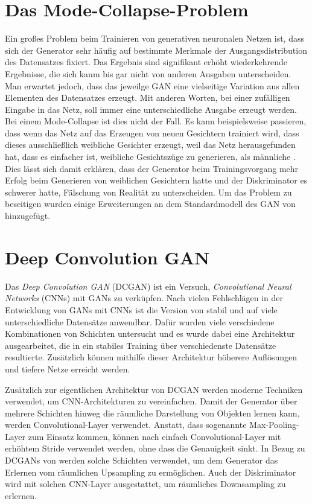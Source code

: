 \documentclass{hsflensburg}
\begin{document}
  \section{Das Mode-Collapse-Problem}
  Ein großes Problem beim Trainieren von generativen neuronalen Netzen ist, dass
  sich der Generator sehr häufig auf bestimmte Merkmale der Ausgangsdistribution
  des Datensatzes fixiert. Das Ergebnis sind signifikant erhöht wiederkehrende
  Ergebnisse, die sich kaum bis gar nicht von anderen Ausgaben unterscheiden.
  Man erwartet jedoch, dass das jeweilge GAN eine vielseitige Variation aus
  allen Elementen des Datensatzes erzeugt. Mit anderen Worten, bei einer
  zufälligen Eingabe in das Netz, soll immer eine unterschiedliche Ausgabe
  erzeugt werden. Bei einem Mode-Collapse ist dies nicht der Fall. Es kann
  beispielsweise passieren, dass wenn das Netz auf das Erzeugen von neuen
  Gesichtern trainiert wird, dass dieses ausschließlich weibliche Gesichter
  erzeugt, weil das Netz herausgefunden hat, dass es einfacher ist, weibliche
  Gesichtszüge zu generieren, als männliche \cite{richardson2018gans}. Dies
  lässt sich damit erklären, dass der Generator beim Trainingsvorgang mehr
  Erfolg beim Generieren von weiblichen Gesichtern hatte und der Diskriminator
  es schwerer hatte, Fälschung von Realität zu unterscheiden. Um das Problem zu
  beseitigen wurden einige Erweiterungen an dem Standardmodell des GAN von
  \cite{goodfellow2014generative} hinzugefügt.

  \section{Deep Convolution GAN}
  Das \textit{Deep Convolution GAN} (DCGAN) ist ein Versuch,
  \textit{Convolutional Neural Networks} (CNNs) mit GANs zu verküpfen. Nach
  vielen Fehlschlägen in der Entwicklung von GANs mit CNNs ist die Version von
  \cite{radford2016unsupervised} stabil und auf viele unterschiedliche
  Datensätze anwendbar. Dafür wurden viele verschiedene Kombinationen von
  Schichten untersucht und es wurde dabei eine Architektur ausgearbeitet, die
  in ein stabiles Training über verschiedenste Datensätze resultierte.
  Zusätzlich können mithilfe dieser Architektur höherere Auflösungen und tiefere
  Netze erreicht werden.

  Zusätzlich zur eigentlichen Architektur von DCGAN werden moderne Techniken
  verwendet, um CNN-Architekturen zu vereinfachen.  Damit der Generator über
  mehrere Schichten hinweg die räumliche Darstellung von Objekten lernen kann,
  werden Convolutional-Layer verwendet. Anstatt, dass sogenannte
  Max-Pooling-Layer zum Einsatz kommen, können nach
  \cite{springenberg2015striving} einfach Convolutional-Layer mit erhöhtem
  Stride verwendet werden, ohne dass die Genauigkeit sinkt. In Bezug zu DCGANs
  von \cite{radford2016unsupervised} werden solche Schichten verwendet, um dem
  Generator das Erlernen vom räumlichen Upsampling zu ermöglichen. Auch der
  Diskriminator wird mit solchen CNN-Layer ausgestattet, um räumliches
  Downsampling zu erlernen.
\end{document}
